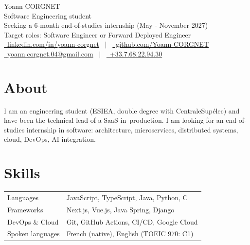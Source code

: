 \documentclass[a4paper,10pt]{article}
\begin{document}
\pagestyle{empty} 


\begin{minipage}{0.83\textwidth} %
    \Huge{Yoann CORGNET} \\[3pt]
    \large{Software Engineering student} \\
    \large{Seeking a 6-month end-of-studies internship (May - November 2027)} \\
    \large{Target roles: Software Engineer or Forward Deployed Engineer} \\[7.5pt]
    \href{https://www.linkedin.com/in/yoann-corgnet/}{\raisebox{-0.05\height}\faLinkedin\ linkedin.com/in/yoann-corgnet} \ $|$ \
    \href{https://github.com/Yoann-CORGNET}{\raisebox{-0.05\height}\faGithub\ github.com/Yoann-CORGNET} \\
    \href{mailto:yoann.corgnet.04@gmail.com}{\raisebox{-0.05\height}\faEnvelope \ yoann.corgnet.04@gmail.com} \ $|$ \
    \href{tel:+33768229430}{\raisebox{-0.05\height}\faMobile \ +33.7.68.22.94.30}
\end{minipage}



\section{About}
I am an engineering student (ESIEA, double degree with CentraleSupélec) and have been the technical lead of a SaaS \mbox{in production.} I am looking for an end-of-studies internship in software: architecture, microservices, distributed systems, cloud, DevOps, AI integration.


\section{Skills}
\begin{tabularx}{\linewidth}{@{}l X@{}}
Languages  &  \normalsize{JavaScript, TypeScript, Java, Python, C}\\
Frameworks  &  \normalsize{Next.js, Vue.js, Java Spring, Django}\\
DevOps \& Cloud  &  \normalsize{Git, GitHub Actions, CI/CD, Google Cloud}\\
Spoken languages  &  \normalsize{French (native), English (TOEIC 970: C1)}\\
\end{tabularx}
\end{document}
